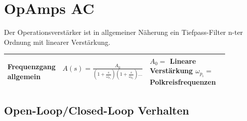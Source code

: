 \section{OpAmps AC}

Der Operationsverstärker ist in allgemeiner Näherung ein Tiefpass-Filter n-ter Ordnung mit linearer Verstärkung.

 \begin{tabular}{|p{0.15\linewidth}|p{0.28\linewidth}|p{0.445\linewidth}|}
 	\hline
 	Frequenzgang allgemein
 		& \large{$A(s) = \frac{A_{0}}{(1+\frac{s}{\omega_{p_1}})(1+\frac{s}{\omega_{p_2}})\dots}$}
 		& $A_{0}=$ Lineare Verstärkung \newline $\omega_{p_i}=$ Polkreisfrequenzen \\
 	\hline
 \end{tabular}
 
\subsection{Open-Loop/Closed-Loop Verhalten}

